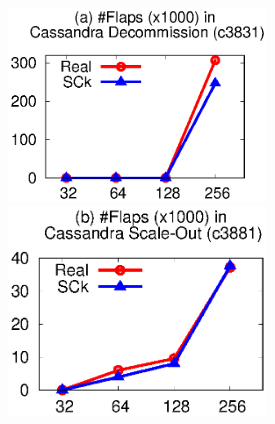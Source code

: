 

\def \fgw {2.7in}


\begin{figure}

\vminten

\centerline{
\includegraphics[width=\fgw]{F/old-bugs/eps/cass2.eps}
\includegraphics[width=\fgw]{F/old-bugs/eps/cass3.eps}
}


\end{figure}
